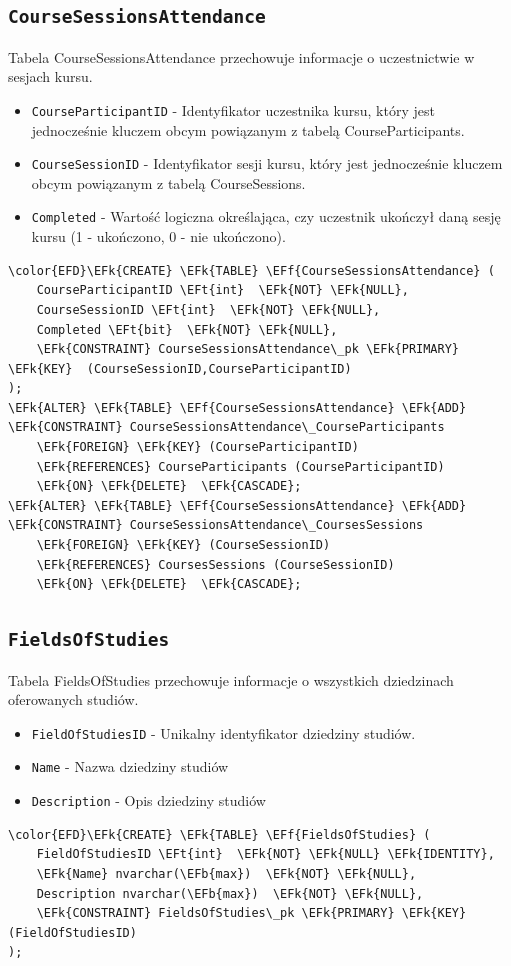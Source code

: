 \documentclass[11pt]{article}
\newcommand{\EFk}[1]{\textcolor{EFk}{\textbf{#1}}} %
\newcommand{\EFb}[1]{\textcolor{EFb}{\textbf{#1}}} %
\newcommand{\EFf}[1]{\textcolor{EFf}{#1}} %
\newcommand{\EFt}[1]{\textcolor{EFt}{\textbf{#1}}} %
\begin{document}
\subsection{\texttt{CourseSessionsAttendance}}
\label{sec:orgc4f2785}
Tabela CourseSessionsAttendance przechowuje informacje o uczestnictwie w sesjach kursu.
\begin{itemize}
\item \texttt{CourseParticipantID} - Identyfikator uczestnika kursu, który jest jednocześnie kluczem obcym powiązanym z tabelą CourseParticipants.
\item \texttt{CourseSessionID} - Identyfikator sesji kursu, który jest jednocześnie kluczem obcym powiązanym z tabelą CourseSessions.
\item \texttt{Completed} - Wartość logiczna określająca, czy uczestnik ukończył daną sesję kursu (1 - ukończono, 0 - nie ukończono).
\end{itemize}
\begin{Code}
\begin{Verbatim}
\color{EFD}\EFk{CREATE} \EFk{TABLE} \EFf{CourseSessionsAttendance} (
    CourseParticipantID \EFt{int}  \EFk{NOT} \EFk{NULL},
    CourseSessionID \EFt{int}  \EFk{NOT} \EFk{NULL},
    Completed \EFt{bit}  \EFk{NOT} \EFk{NULL},
    \EFk{CONSTRAINT} CourseSessionsAttendance\_pk \EFk{PRIMARY} \EFk{KEY}  (CourseSessionID,CourseParticipantID)
);
\EFk{ALTER} \EFk{TABLE} \EFf{CourseSessionsAttendance} \EFk{ADD} \EFk{CONSTRAINT} CourseSessionsAttendance\_CourseParticipants
    \EFk{FOREIGN} \EFk{KEY} (CourseParticipantID)
    \EFk{REFERENCES} CourseParticipants (CourseParticipantID)
    \EFk{ON} \EFk{DELETE}  \EFk{CASCADE};
\EFk{ALTER} \EFk{TABLE} \EFf{CourseSessionsAttendance} \EFk{ADD} \EFk{CONSTRAINT} CourseSessionsAttendance\_CoursesSessions
    \EFk{FOREIGN} \EFk{KEY} (CourseSessionID)
    \EFk{REFERENCES} CoursesSessions (CourseSessionID)
    \EFk{ON} \EFk{DELETE}  \EFk{CASCADE};
\end{Verbatim}
\end{Code}
\subsection{\texttt{FieldsOfStudies}}
\label{sec:orgb55998b}
Tabela FieldsOfStudies przechowuje informacje o wszystkich dziedzinach oferowanych studiów.
\begin{itemize}
\item \texttt{FieldOfStudiesID} - Unikalny identyfikator dziedziny studiów.
\item \texttt{Name} - Nazwa dziedziny studiów
\item \texttt{Description} - Opis dziedziny studiów
\end{itemize}
\begin{Code}
\begin{Verbatim}
\color{EFD}\EFk{CREATE} \EFk{TABLE} \EFf{FieldsOfStudies} (
    FieldOfStudiesID \EFt{int}  \EFk{NOT} \EFk{NULL} \EFk{IDENTITY},
    \EFk{Name} nvarchar(\EFb{max})  \EFk{NOT} \EFk{NULL},
    Description nvarchar(\EFb{max})  \EFk{NOT} \EFk{NULL},
    \EFk{CONSTRAINT} FieldsOfStudies\_pk \EFk{PRIMARY} \EFk{KEY}  (FieldOfStudiesID)
);
\end{Verbatim}
\end{Code}
\end{document}
